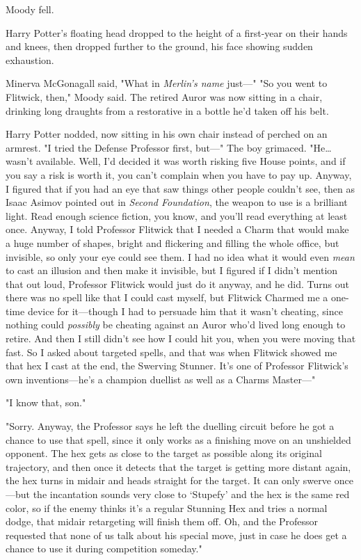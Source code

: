 Moody fell.

Harry Potter's floating head dropped to the height of a first-year on their 
hands and knees, then dropped further to the ground, his face showing sudden 
exhaustion.

Minerva McGonagall said, "What in \emph{Merlin's name} just---"
\sbreak
"So you went to Flitwick, then," Moody said. The retired Auror was now sitting 
in a chair, drinking long draughts from a restorative in a bottle he'd taken 
off his belt.

Harry Potter nodded, now sitting in his own chair instead of perched on an 
armrest. "I tried the Defense Professor first, but---" The boy grimaced. 
"He{\ldots} wasn't available. Well, I'd decided it was worth risking five House 
points, and if you say a risk is worth it, you can't complain when you have to 
pay up. Anyway, I figured that if you had an eye that saw things other people 
couldn't see, then as Isaac Asimov pointed out in \emph{Second Foundation}, the 
weapon to use is a brilliant light. Read enough science fiction, you know, and 
you'll read everything at least once. Anyway, I told Professor Flitwick that I 
needed a Charm that would make a huge number of shapes, bright and flickering 
and filling the whole office, but invisible, so only your eye could see them. I 
had no idea what it would even \emph{mean} to cast an illusion and then make it 
invisible, but I figured if I didn't mention that out loud, Professor Flitwick 
would just do it anyway, and he did. Turns out there was no spell like that I 
could cast myself, but Flitwick Charmed me a one-time device for it---though I 
had to persuade him that it wasn't cheating, since nothing could 
\emph{possibly} be cheating against an Auror who'd lived long enough to retire. 
And then I still didn't see how I could hit you, when you were moving that 
fast. So I asked about targeted spells, and that was when Flitwick showed me 
that hex I cast at the end, the Swerving Stunner. It's one of Professor 
Flitwick's own inventions---he's a champion duellist as well as a Charms 
Master---"

"I know that, son."

"Sorry. Anyway, the Professor says he left the duelling circuit before he got a 
chance to use that spell, since it only works as a finishing move on an 
unshielded opponent. The hex gets as close to the target as possible along its 
original trajectory, and then once it detects that the target is getting more 
distant again, the hex turns in midair and heads straight for the target. It 
can only swerve once---but the incantation sounds very close to `Stupefy' and 
the hex is the same red color, so if the enemy thinks it's a regular Stunning 
Hex and tries a normal dodge, that midair retargeting will finish them off. Oh, 
and the Professor requested that none of us talk about his special move, just 
in case he does get a chance to use it during competition someday."


